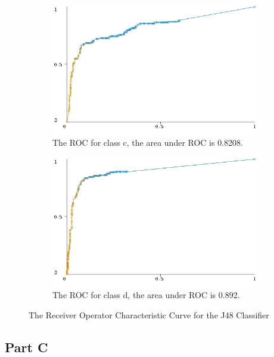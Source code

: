 \documentclass[10pt]{article}
\begin{document}
\begin{figure}[h]
\begin{subfigure}[b]{0.475\textwidth}
        \includegraphics[width=\textwidth]{c45_roc/roc_curve_c.jpg}
        \caption[]%
        {{\small The ROC for class c, the area under ROC is 0.8208.}}    
        \label{fig:c45 roc curve class c}
    \end{subfigure}
    \quad
    \begin{subfigure}[b]{0.475\textwidth}   
        \centering 
        \includegraphics[width=\textwidth]{c45_roc/roc_curve_e(d).jpg}
        \caption[]%
        {{\small The ROC for class d, the area under ROC is 0.892.}}    
        \label{fig:c45 roc curve class d}
    \end{subfigure}
    \caption[ ]
    {\small The Receiver Operator Characteristic Curve for the J48 Classifier} 
    \label{fig:c45 roc curves}
\end{figure}



\subsection*{Part C}
\end{document}
